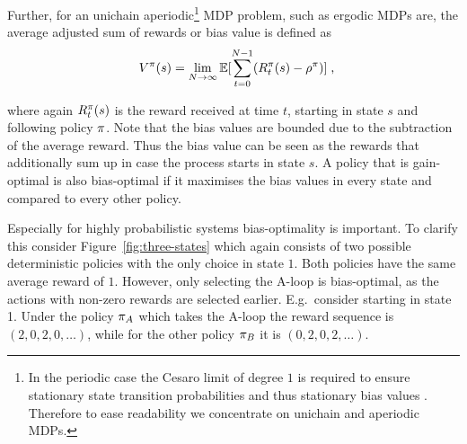 \documentclass[envcountsame]{llncs}
\begin{document}
Further, for an unichain aperiodic\footnote{In the periodic case the Cesaro limit of degree \(1\)
  is required to ensure stationary state transition probabilities and thus stationary bias
  values \citep{Puterman94}. Therefore to ease readability we concentrate on unichain
  and aperiodic MDPs.} MDP problem, such as ergodic MDPs are, the average adjusted sum of rewards or
bias value is defined as
\begin{align*}
  V^{\pol}(s) = \lim_{N \to \infty}{ \E [ \sum_{t=0}^{N-1}(R_{t}^{\pol}(s) - \avgrew^{\pol} )]}\tcom
\end{align*}


where again \(R_{t}^{\pi}(s)\) is the reward received at time \(t\), starting in state \(s\) and
following policy \(\pi\). Note that the bias values are bounded due to the subtraction of the
average reward. Thus the bias value can be seen as the rewards that additionally sum up in case the
process starts in state \(s\). A policy that is gain-optimal is also bias-optimal if it maximises
the bias values in every state and compared to every other policy.


Especially for highly probabilistic systems bias-optimality is important. To clarify this consider
Figure~\ref{fig:three-states} which again consists of two possible deterministic policies with the
only choice in state \(1\). Both policies have the same average reward of \(1\). However, only
selecting the A-loop is bias-optimal, as the actions with non-zero rewards are selected earlier.
E.g.~consider starting in state 1. Under the policy \(\pi_{A}\) which takes the A-loop the reward
sequence is \((2,0,2,0,\ldots)\), while for the other policy \(\pi_{B}\) it is
\((0,2,0,2,\ldots)\).
\end{document}
